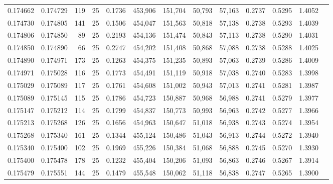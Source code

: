 \begin{tabular}{rrrrrrrrrrrrr}
0.174662 & 0.174729 &   119 &  25 &                                     0.1736 & 453,906 & 151,704 &  50,793 &  57,163 & 0.2737 & 0.5295 & 1.4052 \\
0.174730 & 0.174805 &   141 &  25 &                                     0.1506 & 454,047 & 151,563 &  50,818 &  57,138 & 0.2738 & 0.5293 & 1.4039 \\
0.174806 & 0.174850 &    89 &  25 &                                     0.2193 & 454,136 & 151,474 &  50,843 &  57,113 & 0.2738 & 0.5290 & 1.4031 \\
0.174850 & 0.174890 &    66 &  25 &                                     0.2747 & 454,202 & 151,408 &  50,868 &  57,088 & 0.2738 & 0.5288 & 1.4025 \\
0.174890 & 0.174971 &   173 &  25 &                                     0.1263 & 454,375 & 151,235 &  50,893 &  57,063 & 0.2739 & 0.5286 & 1.4009 \\
0.174971 & 0.175028 &   116 &  25 &                                     0.1773 & 454,491 & 151,119 &  50,918 &  57,038 & 0.2740 & 0.5283 & 1.3998 \\
0.175029 & 0.175089 &   117 &  25 &                                     0.1761 & 454,608 & 151,002 &  50,943 &  57,013 & 0.2741 & 0.5281 & 1.3987 \\
0.175089 & 0.175145 &   115 &  25 &                                     0.1786 & 454,723 & 150,887 &  50,968 &  56,988 & 0.2741 & 0.5279 & 1.3977 \\
0.175147 & 0.175212 &   114 &  25 &                                     0.1799 & 454,837 & 150,773 &  50,993 &  56,963 & 0.2742 & 0.5277 & 1.3966 \\
0.175213 & 0.175268 &   126 &  25 &                                     0.1656 & 454,963 & 150,647 &  51,018 &  56,938 & 0.2743 & 0.5274 & 1.3954 \\
0.175268 & 0.175340 &   161 &  25 &                                     0.1344 & 455,124 & 150,486 &  51,043 &  56,913 & 0.2744 & 0.5272 & 1.3940 \\
0.175340 & 0.175400 &   102 &  25 &                                     0.1969 & 455,226 & 150,384 &  51,068 &  56,888 & 0.2745 & 0.5270 & 1.3930 \\
0.175400 & 0.175478 &   178 &  25 &                                     0.1232 & 455,404 & 150,206 &  51,093 &  56,863 & 0.2746 & 0.5267 & 1.3914 \\
0.175479 & 0.175551 &   144 &  25 &                                     0.1479 & 455,548 & 150,062 &  51,118 &  56,838 & 0.2747 & 0.5265 & 1.3900 \\

\end{tabular}
